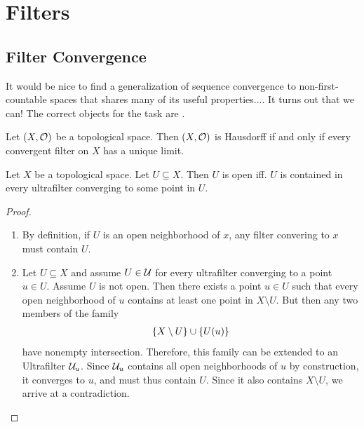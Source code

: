 \chapter{Filters}
\section{Filter Convergence}
It would be nice to find a generalization of sequence convergence to non-first-countable spaces that shares many of its useful properties.... It turns out that we can! The correct objects for the task are .
\begin{exercise}
	Let $(X, \mathcal{O})$ be a topological space. Then $(X, \mathcal{O})$ is Hausdorff if and only if every convergent filter on $X$ has a unique limit.
\end{exercise}
\begin{theorem}
	\label{th:ultrafilteropen}
	Let $X$ be a topological space. Let $U \subseteq X$. Then $U$ is open iff. $U$ is contained in every ultrafilter converging to some point in $U$.
\end{theorem}
\begin{proof}
	\begin{enumerate}
		\item[$\Rightarrow$:] By definition, if $U$ is an open neighborhood of $x$, any filter convering to $x$ must contain $U$.
		\item[$\Leftarrow$:] Let $U \subseteq X$ and assume $U \in \mathcal{U}$ for every ultrafilter converging to a point $u \in U$. Assume $U$ is not open. Then there exists a point $u \in U$ such that every open neighborhood of $u$ contains at least one point in $X \setminus U$. But then any two members of the family
		\begin{align*}
			\qty{X \setminus U} \cup \qty{U(u)}
		\end{align*}
		have nonempty intersection. Therefore, this family can be extended to an Ultrafilter $\mathcal{U}_u$. Since $\mathcal{U}_u$ contains all open neighborhoods of $u$ by construction, it converges to $u$, and must thus contain $U$. Since it also contains $X \setminus U$, we arrive at a contradiction.
	\end{enumerate}
\end{proof}
